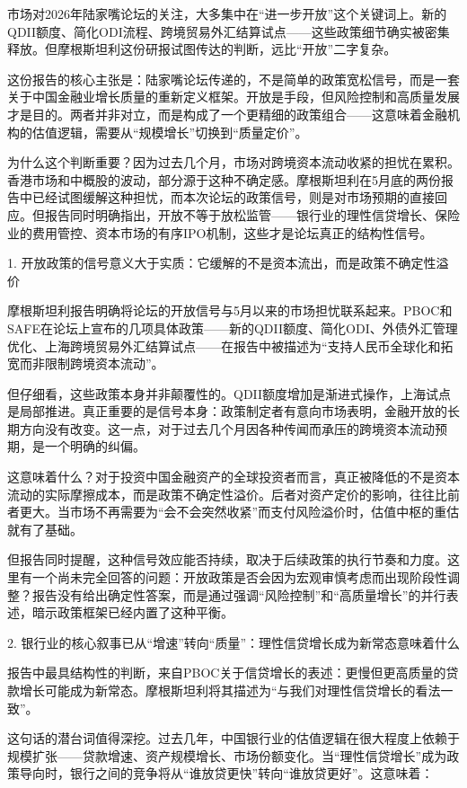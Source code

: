 \documentclass[11pt]{ctexart}
\begin{document}
市场对2026年陆家嘴论坛的关注，大多集中在“进一步开放”这个关键词上。新的QDII额度、简化ODI流程、跨境贸易外汇结算试点——这些政策细节确实被密集释放。但摩根斯坦利这份研报试图传达的判断，远比“开放”二字复杂。

这份报告的核心主张是：陆家嘴论坛传递的，不是简单的政策宽松信号，而是一套关于中国金融业增长质量的重新定义框架。开放是手段，但风险控制和高质量发展才是目的。两者并非对立，而是构成了一个更精细的政策组合——这意味着金融机构的估值逻辑，需要从“规模增长”切换到“质量定价”。

为什么这个判断重要？因为过去几个月，市场对跨境资本流动收紧的担忧在累积。香港市场和中概股的波动，部分源于这种不确定感。摩根斯坦利在5月底的两份报告中已经试图缓解这种担忧，而本次论坛的政策信号，则是对市场预期的直接回应。但报告同时明确指出，开放不等于放松监管——银行业的理性信贷增长、保险业的费用管控、资本市场的有序IPO机制，这些才是论坛真正的结构性信号。

1. 开放政策的信号意义大于实质：它缓解的不是资本流出，而是政策不确定性溢价

摩根斯坦利报告明确将论坛的开放信号与5月以来的市场担忧联系起来。PBOC和SAFE在论坛上宣布的几项具体政策——新的QDII额度、简化ODI、外债外汇管理优化、上海跨境贸易外汇结算试点——在报告中被描述为“支持人民币全球化和拓宽而非限制跨境资本流动”。

但仔细看，这些政策本身并非颠覆性的。QDII额度增加是渐进式操作，上海试点是局部推进。真正重要的是信号本身：政策制定者有意向市场表明，金融开放的长期方向没有改变。这一点，对于过去几个月因各种传闻而承压的跨境资本流动预期，是一个明确的纠偏。

这意味着什么？对于投资中国金融资产的全球投资者而言，真正被降低的不是资本流动的实际摩擦成本，而是政策不确定性溢价。后者对资产定价的影响，往往比前者更大。当市场不再需要为“会不会突然收紧”而支付风险溢价时，估值中枢的重估就有了基础。

但报告同时提醒，这种信号效应能否持续，取决于后续政策的执行节奏和力度。这里有一个尚未完全回答的问题：开放政策是否会因为宏观审慎考虑而出现阶段性调整？报告没有给出确定性答案，而是通过强调“风险控制”和“高质量增长”的并行表述，暗示政策框架已经内置了这种平衡。

2. 银行业的核心叙事已从“增速”转向“质量”：理性信贷增长成为新常态意味着什么

报告中最具结构性的判断，来自PBOC关于信贷增长的表述：更慢但更高质量的贷款增长可能成为新常态。摩根斯坦利将其描述为“与我们对理性信贷增长的看法一致”。

这句话的潜台词值得深挖。过去几年，中国银行业的估值逻辑在很大程度上依赖于规模扩张——贷款增速、资产规模增长、市场份额变化。当“理性信贷增长”成为政策导向时，银行之间的竞争将从“谁放贷更快”转向“谁放贷更好”。这意味着：
\end{document}
